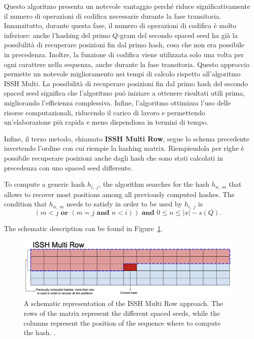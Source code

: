 Questo algoritmo presenta un notevole vantaggio perché riduce significativamente il numero di operazioni di codifica necessarie durante la fase transitoria. Innanzitutto, durante questa fase, il numero di operazioni di codifica è molto inferiore: anche l'hashing del primo $Q$-gram del secondo spaced seed ha già la possibilità di recuperare posizioni fin dal primo hash, cosa che non era possibile in precedenza. Inoltre, la funzione di codifica viene utilizzata solo una volta per ogni carattere nella sequenza, anche durante la fase transitoria. Questo approccio permette un notevole miglioramento nei tempi di calcolo rispetto all'algoritmo ISSH Multi. La possibilità di recuperare posizioni fin dal primo hash del secondo spaced seed significa che l'algoritmo può iniziare a ottenere risultati utili prima, migliorando l'efficienza complessiva. Infine, l'algoritmo ottimizza l'uso delle risorse computazionali, riducendo il carico di lavoro e permettendo un'elaborazione più rapida e meno dispendiosa in termini di tempo.

Infine, il terzo metodo, chiamato \textbf{ISSH Multi Row}, segue lo schema precedente invertendo l'ordine con cui riempie la hashing matrix. Riempiendola per righe è possibile recuperare posizioni anche dagli hash che sono stati calcolati in precedenza con uno spaced seed differente.

To compute a generic hash $h_{i,\; j}$, the algorithm searches for the hash $h_{n,\; m}$ that allows to recover most positions among all previously computed hashes. The condition that $h_{n,\; m}$ needs to satisfy in order to be used by $h_{i,\; j}$ is \begin{equation}\label{eq:issh_multi_row_condition}
	(m < j \textbf{ or } (m = j \textbf{ and } n < i)) \textbf{ and } 0 \leq n \leq |x| - s(Q).
\end{equation}

The schematic description can be found in Figure~\ref{fig:issh_multi_row}.

\begin{figure}[!ht]
	\centering
	\includegraphics[width=0.85\linewidth]{images/issh_multi_row}
	\caption{A schematic representation of the ISSH Multi Row approach. The rows of the matrix represent the different spaced seeds, while the columns represent the position of the sequence where to compute the hash. \cite{mian2023missh}.}
	\label{fig:issh_multi_row}
\end{figure}

